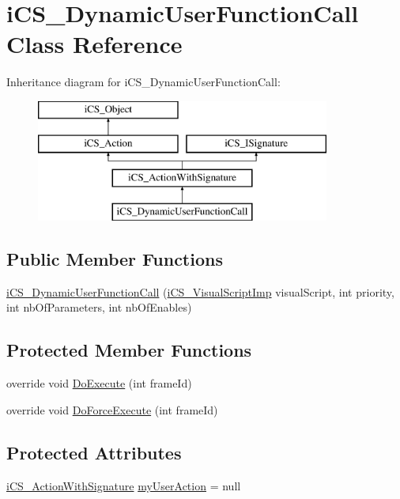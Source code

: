 \hypertarget{classi_c_s___dynamic_user_function_call}{\section{i\+C\+S\+\_\+\+Dynamic\+User\+Function\+Call Class Reference}
\label{classi_c_s___dynamic_user_function_call}
}
Inheritance diagram for i\+C\+S\+\_\+\+Dynamic\+User\+Function\+Call\+:\begin{figure}[H]
\begin{center}
\leavevmode
\includegraphics[height=4.000000cm]{classi_c_s___dynamic_user_function_call}
\end{center}
\end{figure}
\subsection*{Public Member Functions}
\begin{DoxyCompactItemize}
\item 
\hyperlink{classi_c_s___dynamic_user_function_call_a5469458a636f64edb30234388dfc2492}{i\+C\+S\+\_\+\+Dynamic\+User\+Function\+Call} (\hyperlink{classi_c_s___visual_script_imp}{i\+C\+S\+\_\+\+Visual\+Script\+Imp} visual\+Script, int priority, int nb\+Of\+Parameters, int nb\+Of\+Enables)
\end{DoxyCompactItemize}
\subsection*{Protected Member Functions}
\begin{DoxyCompactItemize}
\item 
override void \hyperlink{classi_c_s___dynamic_user_function_call_a516023003dc54a3e4f46c81433d30ecc}{Do\+Execute} (int frame\+Id)
\item 
override void \hyperlink{classi_c_s___dynamic_user_function_call_a56a928c714f14886daef280f759dc32b}{Do\+Force\+Execute} (int frame\+Id)
\end{DoxyCompactItemize}
\subsection*{Protected Attributes}
\begin{DoxyCompactItemize}
\item 
\hyperlink{classi_c_s___action_with_signature}{i\+C\+S\+\_\+\+Action\+With\+Signature} \hyperlink{classi_c_s___dynamic_user_function_call_aebbaabd1ab956b102ad24210a9e6eca0}{my\+User\+Action} = null
\end{DoxyCompactItemize}
